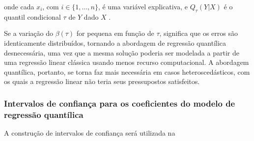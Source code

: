\noindent onde cada $x_{i}$, com $i \in \{1, ..., n\}$, é uma variável explicativa, e $Q_\tau(Y | X)$ é o quantil condicional $\tau$ de $Y$ dado $X$  \cite{koenker2005}.

Se a variação do $\beta(\tau)$ for pequena em função de $\tau$, significa que os erros são identicamente distribuídos, tornando a abordagem de regressão quantílica desnecessária, uma vez que a mesma solução poderia ser modelada a partir de uma regressão linear clássica usando menos recurso computacional. A abordagem quantílica, portanto, se torna faz mais necessária em casos heteroscedásticos, com os quais a regressão linear não teria seus pressupostos satisfeitos.

\subsubsection{Intervalos de confiança para os coeficientes do modelo de regressão quantílica}
A construção de intervalos de confiança será utilizada na 